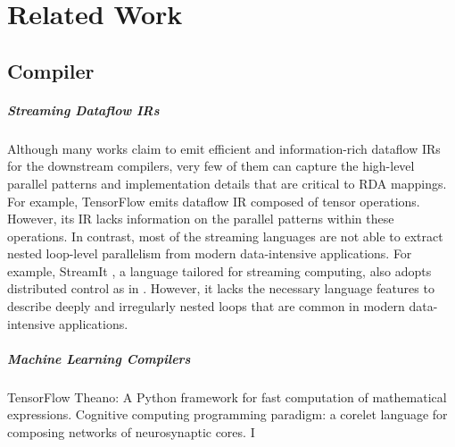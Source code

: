 \chapter{Related Work}

\section{Compiler}
\paragraph{Streaming Dataflow IRs}
Although many works claim to emit efficient and information-rich dataflow IRs for the downstream compilers, 
very few of them can capture the high-level parallel patterns and implementation details that are critical 
to RDA mappings. 
For example, TensorFlow \cite{tensorflow} emits dataflow IR composed of tensor operations. 
However, its IR lacks information on the parallel patterns within these operations. 
In contrast, most of 
the streaming languages \cite{streamit, synaid, maxj} are not able to extract nested loop-level parallelism 
from modern data-intensive applications. 
For example, StreamIt \cite{streamit}, a language tailored for streaming computing, also adopts distributed 
control as in \name{}. 
However, it lacks the necessary language features to describe deeply and irregularly nested loops that are 
common in modern data-intensive applications.


\paragraph{Machine Learning Compilers}
\begin{outline}
\1 TensorFlow
\1 Theano: A Python framework for fast computation of mathematical expressions.
\1 Cognitive computing programming paradigm: a corelet language for composing networks of neurosynaptic
cores. I
\cite{onnc}
\end{outline}


